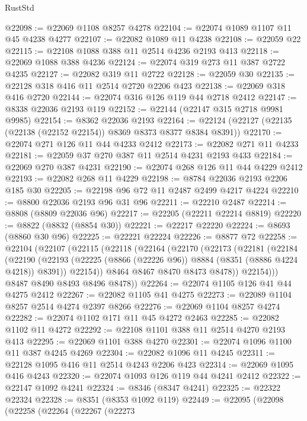 \begin{lexlean}{RustStd}
\begin{coremodule}
@22098 := @22069 @1108 @8257 @4278
@22104 := @22074 @1089 @1107 @11 @45 @4238 @4277
@22107 := @22082 @1089 @11 @4238
@22108 := @22059 @22
@22115 := @22108 @1088 @388 @11 @2514 @4236 @2193 @413
@22118 := @22069 @1088 @388 @4236
@22124 := @22074 @319 @273 @11 @387 @2722 @4235
@22127 := @22082 @319 @11 @2722
@22128 := @22059 @30
@22135 := @22128 @318 @416 @11 @2514 @2720 @2206 @423
@22138 := @22069 @318 @416 @2720
@22144 := @22074 @316 @126 @119 @44 @2718 @2412
@22147 := @8338 @22036 @2193 @119
@22152 := @22144 (@22147 @315 @2718 @9981 @9985)
@22154 := @8362 @22036 @2193
@22164 := @22124 (@22127 (@22135 (@22138 (@22152 @22154)) @8369 @8373 @8377 @8384 @8391))
@22170 := @22074 @271 @126 @11 @44 @4233 @2412
@22173 := @22082 @271 @11 @4233
@22181 := @22059 @37 @270 @387 @11 @2514 @4231 @2193 @433
@22184 := @22069 @270 @387 @4231
@22190 := @22074 @268 @126 @11 @44 @4229 @2412
@22193 := @22082 @268 @11 @4229
@22198 := @8784 @22036 @2193 @2206 @185 @30
@22205 := @22198 @96 @72 @11 @2487 @2499 @4217 @4224
@22210 := @8800 @22036 @2193 @96 @31 @96
@22211 := @22210 @2487
@22214 := @8808 (@8809 @22036 @96)
@22217 := @22205 (@22211 @22214 @8819)
@22220 := @8822 (@8832 (@8854 @30))
@22221 := @22217 @22220
@22224 := @8693 (@8860 @30 @96)
@22225 := @22221 @22224
@22226 := @8877 @72
@22258 := @22104
    (@22107
      (@22115
        (@22118
          (@22164
            (@22170
              (@22173
                (@22181
                  (@22184
                    (@22190
                      (@22193 (@22225 (@8866 (@22226 @96)) @8884 (@8351 (@8886 @4224 @4218)) @8391))
                      @22154))
                  @8464
                  @8467
                  @8470
                  @8473
                  @8478))
              @22154)))
        @8487
        @8490
        @8493
        @8496
        @8478))
@22264 := @22074 @1105 @126 @41 @44 @4275 @2412
@22267 := @22082 @1105 @41 @4275
@22273 := @22089 @1104 @8257 @2514 @4274 @2397 @8266
@22276 := @22069 @1104 @8257 @4274
@22282 := @22074 @1102 @171 @11 @45 @4272 @2463
@22285 := @22082 @1102 @11 @4272
@22292 := @22108 @1101 @388 @11 @2514 @4270 @2193 @413
@22295 := @22069 @1101 @388 @4270
@22301 := @22074 @1096 @1100 @11 @387 @4245 @4269
@22304 := @22082 @1096 @11 @4245
@22311 := @22128 @1095 @416 @11 @2514 @4243 @2206 @423
@22314 := @22069 @1095 @416 @4243
@22320 := @22074 @1093 @126 @119 @44 @4241 @2412
@22322 := @22147 @1092 @4241
@22324 := @8346 (@8347 @4241)
@22325 := @22322 @22324
@22328 := @8351 (@8353 @1092 @119)
@22449 := @22095
    (@22098
      (@22258
        (@22264
          (@22267
            (@22273

\end{coremodule}
\end{lexlean}
